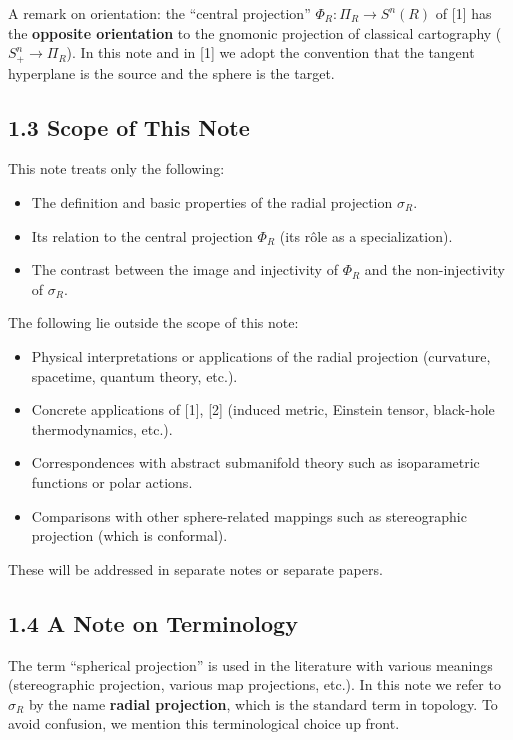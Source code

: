 \documentclass[
]{ltjsarticle}
\providecommand{\tightlist}{%
  \setlength{\itemsep}{0pt}\setlength{\parskip}{0pt}}
\begin{document}
A remark on orientation: the ``central projection''
\(\Phi_R: \Pi_R \to S^n(R)\) of {[}1{]} has the \textbf{opposite
orientation} to the gnomonic projection of classical cartography
(\(S^n_+ \to \Pi_R\)). In this note and in {[}1{]} we adopt the
convention that the tangent hyperplane is the source and the sphere is
the target.

\subsection{1.3 Scope of This Note}\label{scope-of-this-note}

This note treats only the following:

\begin{itemize}
\tightlist
\item
  The definition and basic properties of the radial projection
  \(\sigma_R\).
\item
  Its relation to the central projection \(\Phi_R\) (its rôle as a
  specialization).
\item
  The contrast between the image and injectivity of \(\Phi_R\) and the
  non-injectivity of \(\sigma_R\).
\end{itemize}

The following lie outside the scope of this note:

\begin{itemize}
\tightlist
\item
  Physical interpretations or applications of the radial projection
  (curvature, spacetime, quantum theory, etc.).
\item
  Concrete applications of {[}1{]}, {[}2{]} (induced metric, Einstein
  tensor, black-hole thermodynamics, etc.).
\item
  Correspondences with abstract submanifold theory such as isoparametric
  functions or polar actions.
\item
  Comparisons with other sphere-related mappings such as stereographic
  projection (which is conformal).
\end{itemize}

These will be addressed in separate notes or separate papers.

\subsection{1.4 A Note on Terminology}\label{a-note-on-terminology}

The term ``spherical projection'' is used in the literature with various
meanings (stereographic projection, various map projections, etc.). In
this note we refer to \(\sigma_R\) by the name \textbf{radial
projection}, which is the standard term in topology. To avoid confusion,
we mention this terminological choice up front.
\end{document}
